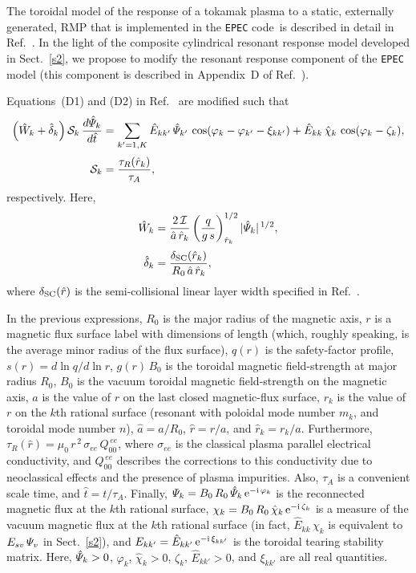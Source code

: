 \documentclass[12pt,prb,aps]{revtex4-1}
\begin{document}
The toroidal model of the response of a tokamak plasma to a static, externally generated, RMP that is implemented in the {\tt EPEC} code\,\cite{rftor1} is described in
detail in Ref.~. In the light of the composite cylindrical resonant response model developed in Sect.~\ref{s2}, we propose to 
modify the resonant  response component of the {\tt EPEC} model (this component is described in Appendix~D of Ref.~).

Equations~(D1) and (D2) in Ref.~ are modified such that 
\begin{align}\label{e15}
\left(\hat{W}_k + \hat{\delta}_k\right){\cal S}_k\,\frac{d\hat{\mit\Psi}_k}{d\hat{t}} &= \sum_{k'=1,K}\hat{E}_{kk'}\,\hat{\mit\Psi}_{k'}\,\cos(\varphi_k-\varphi_{k'}-\xi_{kk'})
+\hat{E}_{kk}\,\hat{\chi}_k\,\cos(\varphi_k-\zeta_k),\\[0.5ex]
{\cal S}_k&=\frac{\tau_R(\hat{r}_k)}{\tau_A},
\end{align}
respectively. Here, 
\begin{align}
\hat{W}_k &=\frac{2\,{\cal I}}{\hat{a}\,\hat{r}_k}\left(\frac{q}{g\,s}\right)_{\hat{r}_k}^{1/2} |\hat{\mit\Psi}_k|^{\,1/2},\\[0.5ex]
\hat{\delta}_k &= \frac{\delta_{\rm SC}(\hat{r}_k)}{R_0\,\hat{a}\,\hat{r}_k},
\end{align}
where $\delta_{\rm SC}(\hat{r})$ is the semi-collisional linear layer width specified in Ref.~.

In the previous expressions, $R_0$ is the major radius of the magnetic axis, $r$ is a magnetic flux surface label with dimensions of length (which, roughly speaking, is the average minor radius of the
flux surface), $q(r)$ is the safety-factor profile, $s(r)=d\ln q/d\ln r$, 
$g(r)\,B_0$ is the toroidal magnetic field-strength at major radius $R_0$, $B_0$ is the vacuum
toroidal magnetic field-strength on the magnetic axis, $a$ is the value of $r$ on the last closed magnetic-flux surface, $r_k$ is the value of $r$ on the $k$th rational
surface (resonant with poloidal mode number $m_k$, and toroidal mode number $n$), $\hat{a}=a/R_0$, $\hat{r}=r/a$, and $\hat{r}_k=r_k/a$. 
Furthermore, $\tau_R(\hat{r})= \mu_0\,r^{\,2}\,\sigma_{ee}\,Q_{00}^{\,ee}$, where $\sigma_{ee}$ is the classical plasma parallel electrical conductivity, and
$Q_{00}^{\,ee}$ describes the corrections to this conductivity due to neoclassical effects and the presence of plasma impurities. Also, $\tau_A$ is a convenient
scale time, and $\hat{t}=t/\tau_A$. Finally, ${\mit\Psi}_k = B_0\,R_0\,\hat{\mit\Psi}_k\,{\rm e}^{-{\rm i}\,\varphi_k}$ is the reconnected magnetic flux
at the $k$th rational surface, ${\mit\chi}_k = B_0\,R_0\,\hat{\mit\chi}_k\,{\rm e}^{-{\rm i}\,\zeta_k}$ is a measure of the vacuum magnetic flux at the $k$th
rational surface (in fact, $\hat{E}_{kk}\,\chi_k$ is equivalent to $E_{sv}\,{\mit\Psi}_v$ in Sect.~\ref{s2}), and $E_{kk'} =\hat{E}_{kk'}\,{\rm e}^{-{\rm i}\,\xi_{kk'}}$ is the toroidal tearing stability matrix.\cite{am1} Here, $\hat{\mit\Psi}_k>0$, $\varphi_k$, $\hat{\chi}_k>0$,
$\zeta_k$, $\hat{E}_{kk'}>0$, and $\xi_{kk'}$ are all real quantities.
\end{document}
